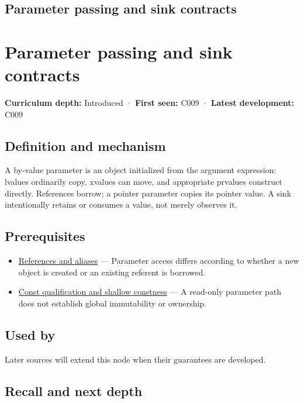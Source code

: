 \hypertarget{appendix-d5908f75721f}{}
\section*{Parameter passing and sink contracts}
\chapter{Parameter passing and sink contracts}\label{appendix-d5908f75721f-parameter-passing-and-sink-contracts}

\textbf{Curriculum depth:} Introduced · \textbf{First seen:} C009 · \textbf{Latest development:} C009

\section{Definition and mechanism}\label{appendix-d5908f75721f-definition-and-mechanism}

A by-value parameter is an object initialized from the argument expression: lvalues ordinarily copy, xvalues can move, and appropriate prvalues construct directly. References borrow; a pointer parameter copies its pointer value. A sink intentionally retains or consumes a value, not merely observes it.

\section{Prerequisites}\label{appendix-d5908f75721f-prerequisites}

\begin{itemize}
\tightlist
\item
  \hyperref[appendix-d6d562ca9fbb]{References and aliases} --- Parameter access differs according to whether a new object is created or an existing referent is borrowed.
\item
  \hyperref[appendix-c25d60fed375]{Const qualification and shallow constness} --- A read-only parameter path does not establish global immutability or ownership.
\end{itemize}

\section{Used by}\label{appendix-d5908f75721f-used-by}

Later sources will extend this node when their guarantees are developed.

\section{Recall and next depth}\label{appendix-d5908f75721f-recall-and-next-depth}

